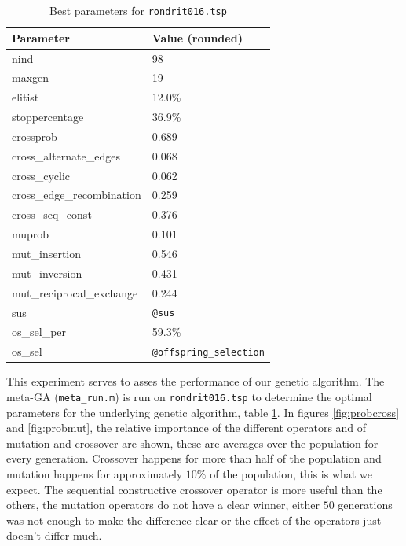 \documentclass[a4paper]{article}
\begin{document}
\begin{table}[h]
  \centering
  \begin{tabular}{l l}
  	\hline
    Parameter									& Value (rounded) \\
  	\hline
    nind										& 98 \\
    maxgen										& 19 \\
    elitist										& 12.0\% \\
    stoppercentage								& 36.9\% \\
    crossprob									& 0.689 \\
    cross\_alternate\_edges						& 0.068 \\
    cross\_cyclic								& 0.062 \\
    cross\_edge\_recombination					& 0.259 \\
    cross\_seq\_const							& 0.376 \\
    muprob										& 0.101 \\
    mut\_insertion								& 0.546 \\
    mut\_inversion								& 0.431 \\
    mut\_reciprocal\_exchange					& 0.244 \\
    sus											& \texttt{@sus} \\
    os\_sel\_per								& 59.3\% \\
    os\_sel										& \texttt{@offspring\_selection} \\
    \hline
  \end{tabular}
  \caption{Best parameters for \texttt{rondrit016.tsp}}
  \label{tab:rondrit016params}
\end{table}

This experiment serves to asses the performance of our genetic
algorithm.
The meta-GA (\texttt{meta\_run.m}) is run on \texttt{rondrit016.tsp} to
determine the optimal parameters for the underlying genetic algorithm,
table \ref{tab:rondrit016params}.
In figures \ref{fig:probcross} and \ref{fig:probmut}, the relative
importance of the different operators and of mutation and crossover
are shown, these are averages over the population for every generation.
Crossover happens for more than half of the population and mutation
happens for approximately $10\%$ of the population, this is what we
expect.
The sequential constructive crossover operator is more useful than the
others, the mutation operators do not have a clear winner, either
$50$ generations was not enough to make the difference clear or the
effect of the operators just doesn't differ much.
\end{document}
